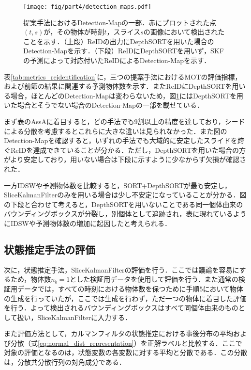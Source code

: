         \begin{figure}[t]
            \centering
            \texttt{[image: fig/part4/detection\_maps.pdf]}
            \caption[提案手法におけるDetection-Mapの一部]{提案手法におけるDetection-Mapの一部．赤にプロットされた点$(t, s)$が，その物体が時刻$t$，スライス$s$の画像において検出されたことを示す．（上段）ReIDの出力にDepthSORTを用いた場合のDetection-Mapを示す．（下段）ReIDにDepthSORTを用いず，SKFの予測によって対応付いたReIDによるDetection-Mapを示す．}
            \label{fig:detection_map}
        \end{figure}

        表\ref{tab:metrics_reidentification}に，三つの提案手法におけるMOTの評価指標，および前節の結果に関連する予測物体数を示す．またReIDにDepthSORTを用いる場合，ほとんどのDetection-Mapは変わらないため，図\ref{fig:detection_map}にはDepthSORTを用いた場合とそうでない場合のDetection-Mapの一部を載せている．

        まず表のAssAに着目すると，どの手法でも$9$割以上の精度を達しており，シードによる分散を考慮するとこれらに大きな違いは見られなかった．また図のDetection-Mapを確認すると，いずれの手法でも大域的に安定したスライドを跨ぐReIDを達成できていることが分かる．ただし，DepthSORTを用いた場合の方がより安定しており，用いない場合は下段に示すように少なからず欠損が確認された．

        一方IDSWや予測物体数を比較すると，SORT+DepthSORTが最も安定し，SliceKalmanFilterのみを用いる場合は少し不安定になっていることが分かる．図の下段と合わせて考えると，DepthSORTを用いないことである同一個体由来のバウンディングボックスが分裂し，別個体として追跡され，表に現れているようにIDSWや予測物体数の増加に起因したと考えられる．

    \subsection{状態推定手法の評価}
    \label{subsec:estimation_evaluation}

    次に，状態推定手法，SliceKalmanFilterの評価を行う．ここでは議論を容易にするため，物体数$n_b = 1$とした検証用データを使用して評価を行う．また通常の検証用データでは，すべての時刻における物体数を保つために手順5において物体の生成を行っていたが，ここでは生成を行わず，ただ一つの物体に着目した評価を行う．よって検出されるバウンディングボックスはすべて同個体由来のものとして扱い，SliceKalmanFilterに入力する．

    また評価方法として，カルマンフィルタの状態推定における事後分布の平均および分散（式\ref{eq:normal_dist_representation}）を正解ラベルと比較する．ここで対象の評価となるのは，状態変数の各変数に対する平均と分散である．この分散は，分散共分散行列の対角成分である．

